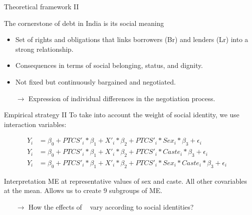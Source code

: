 \documentclass[aspectratio=169]{beamer}
\begin{document}
\begin{frame}{Theoretical framework II}

The cornerstone of debt in India is its social meaning
\begin{itemize}
\item Set of rights and obligations that links borrowers (Br) and lenders (Lr) into a strong relationship.
\item Consequences in terms of social belonging, status, and dignity.
\item Not fixed but continuously bargained and negotiated.
\item[$\rightarrow$] Expression of individual differences in the negotiation process.
\end{itemize}

\end{frame}






\begin{frame}


\end{frame}






\begin{frame}{Empirical strategy II}
To take into account the weight of social identity, we use interaction variables:

\begin{align}
\label{eq:reg2} Y_{i} & = \beta_{0}+PTCS'_{i}*\beta_{1}+X'_{i}*\beta_{2}+PTCS'_{i}*Sex_{i}*\beta_{3}+\epsilon_i  \\ 
\label{eq:reg3} Y_{i} & = \beta_{0}+PTCS'_{i}*\beta_{1}+X'_{i}*\beta_{2}+PTCS'_{i}*Caste_{i}*\beta_{3}+\epsilon_i  \\ 
\label{eq:reg4} Y_{i} & = \beta_{0}+PTCS'_{i}*\beta_{1}+X'_{i}*\beta_{2}+PTCS'_{i}*Sex_{i}*Caste_{i}*\beta_{3}+\epsilon_i 
\end{align}

\begin{greenbox}{Interpretation}
ME at representative values of sex and caste.
All other covariables at the mean. 
Allows us to create 9 subgroups of ME. 
\begin{itemize}
\item[$\rightarrow$] How the effects of \PTCS~ vary according to social identities?
\end{itemize}
\end{greenbox}

\end{frame}
\end{document}
